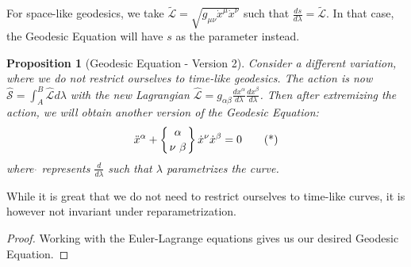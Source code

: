 \documentclass[a4paper]{article}
\theoremstyle{new}
\newtheorem{prop}{Proposition}[section]
\begin{document}
For space-like geodesics, we take $\tilde{\mathcal{L}}=\sqrt{g_{\mu\nu}\dot{x}^\mu\dot{x}^\nu}$ such that $\frac{ds}{d\lambda}=\tilde{\mathcal{L}}$. In that case, the Geodesic Equation will have $s$ as the parameter instead.
\begin{prop}[Geodesic Equation - Version 2]
Consider a different variation, where we do not restrict ourselves to time-like geodesics. The action is now $\hat{\mathcal{S}}=\int_A^B\hat{\mathcal{L}}d\lambda$ with the new Lagrangian $\hat{\mathcal{L}}=g_{\alpha\beta}\frac{dx^\alpha}{d\lambda}\frac{dx^\beta}{d\lambda}$. Then after extremizing the action, we will obtain another version of the Geodesic Equation:
\begin{equation}
    \ddot{x}^\alpha+ \left \{ {\alpha \atop
\nu\ \beta}\right\} \dot{x}^\nu\dot{x}^\beta=0\tag{*}
\end{equation}
where $\dot{ }$ represents $\frac{d}{d\lambda}$ such that $\lambda$ parametrizes the curve. 
\end{prop}
While it is great that we do not need to restrict ourselves to time-like curves, it is however not invariant under reparametrization. 
\begin{proof}
Working with the Euler-Lagrange equations gives us our desired Geodesic Equation. 
\end{proof}
\end{document}
